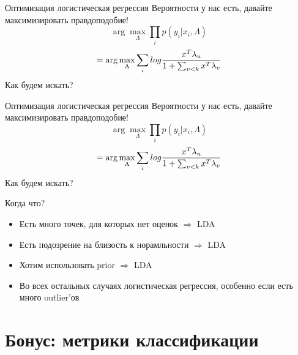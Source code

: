 \documentclass[14pt, fleqn, xcolor={dvipsnames, table}]{beamer}
\begin{document}
\begin{frame}{Оптимизация логистическая регрессия}
Вероятности у нас есть, давайте максимизировать правдоподобие!
$$
\arg \max_\Lambda \prod_i p(y_i|x_i, \Lambda)
$$
$$
= \arg \max_\Lambda \sum_i log {x^T \lambda_{u} \over 1 + \sum_{v < k} x^T\lambda_v}
$$
Как будем искать?
\end{frame}

\begin{frame}{Оптимизация логистическая регрессия}
Вероятности у нас есть, давайте максимизировать правдоподобие!
$$
\arg \max_\Lambda \prod_i p(y_i|x_i, \Lambda)
$$
$$
= \arg \max_\Lambda \sum_i log {x^T \lambda_{u} \over 1 + \sum_{v < k} x^T\lambda_v}
$$
Как будем искать?
\end{frame}

\begin{frame}{Когда что?}
\begin{itemize}
  \item Есть много точек, для которых нет оценок $\Rightarrow$ LDA
  \item Есть подозрение на близость к норамльности $\Rightarrow$ LDA
  \item Хотим использовать prior $\Rightarrow$ LDA
  \item Во всех остальных случаях логистическая регрессия, особенно если есть много outlier'ов
\end{itemize}
\end{frame}

\section{Бонус: метрики классификации}
\end{document}
